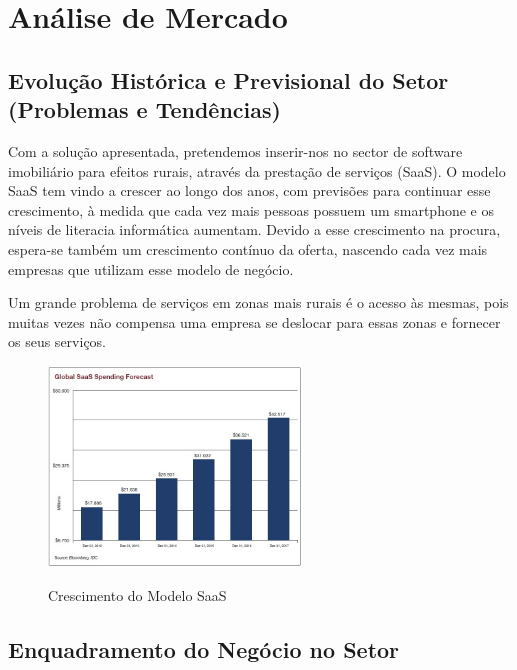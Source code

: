 \documentclass[11pt]{article}
\begin{document}
	\pagebreak
	
	\large
	\section{Análise de Mercado}
	
	\normalsize
	
	\large
	\subsection{Evolução Histórica e Previsional do Setor (Problemas e Tendências)}
	
	\normalsize
	
	Com a solução apresentada, pretendemos inserir-nos no sector de software imobiliário para efeitos rurais, através da prestação de serviços (SaaS). O modelo SaaS tem vindo a crescer ao longo dos anos, com previsões para continuar esse crescimento, à medida que cada vez mais pessoas possuem um smartphone e os níveis de literacia informática aumentam. Devido a esse crescimento na procura, espera-se também um crescimento contínuo da oferta, nascendo cada vez mais empresas que utilizam esse modelo de negócio. 
	
	Um grande problema de serviços em zonas mais rurais é o acesso às mesmas, pois muitas vezes não compensa uma empresa se deslocar para essas zonas e fornecer os seus serviços.
	
	\begin{figure}[h]
		\includegraphics[width=0.6\textwidth,keepaspectratio]{crescimentoSaaS}
		\label{fig:crescimentoSaaS}
		\centering
		\caption{Crescimento do Modelo SaaS}
	\end{figure}
	
	
	
	\large
	\subsection{Enquadramento do Negócio no Setor}
	
\end{document}
